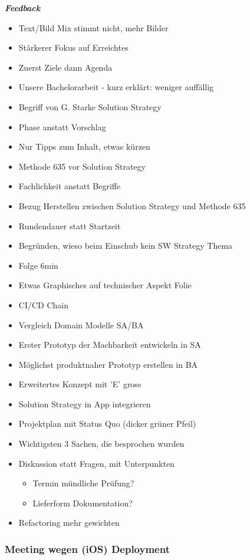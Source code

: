 \emph{\textbf{Feedback}}

\begin{itemize}
\item Text/Bild Mix stimmt nicht, mehr Bilder
\item Stärkerer Fokus auf Erreichtes
\item Zuerst Ziele dann Agenda
\item Unsere Bachelorarbeit - kurz erklärt: weniger auffällig
\item Begriff von G. Starke Solution Strategy
\item Phase anstatt Vorschlag
\item Nur Tipps zum Inhalt, etwas kürzen
\item Methode 635 vor Solution Strategy
\item Fachlichkeit anstatt Begriffe
\item Bezug Herstellen zwischen Solution Strategy und Methode 635
\item Rundendauer statt Startzeit
\item Begründen, wieso beim Einschub kein SW Strategy Thema
\item Folge 6min
\item Etwas Graphisches auf technischer Aspekt Folie
\item CI/CD Chain
\item Vergleich Domain Modelle SA/BA
\item Erster Prototyp der Machbarkeit entwickeln in SA
\item Möglichst produktnaher Prototyp erstellen in BA
\item Erweitertes Konzept mit 'E' gross
\item Solution Strategy in App integrieren
\item Projektplan mit Status Quo (dicker grüner Pfeil)
\item Wichtigsten 3 Sachen, die besprochen wurden
\item Diskussion statt Fragen, mit Unterpunkten
  \begin{itemize}
  \item Termin mündliche Prüfung?
  \item Lieferform Dokumentation?
  \end{itemize}
\item Refactoring mehr gewichten
\end{itemize}

\hypertarget{meeting-wegen-ios-deployment}{%
\subsubsection*{Meeting wegen (iOS)
Deployment}\label{meeting-wegen-ios-deployment}}

